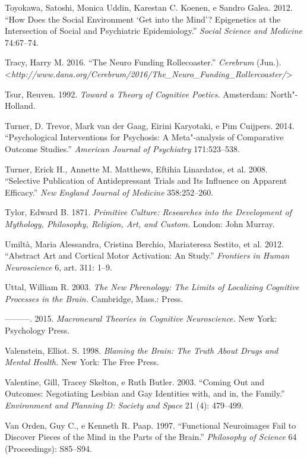 Toyokawa, Satoshi, Monica Uddin, Karestan C. Koenen, e Sandro Galea.
2012. ``How Does the Social Environment `Get into the Mind'? Epigenetics
at the Intersection of Social and Psychiatric Epidemiology.''
\emph{Social Science and Medicine} 74:67--74.

Tracy, Harry M. 2016. ``The Neuro Funding Rollecoaster.''
\emph{Cerebrum} (Jun.).
\textless{}\emph{http://www.dana.org/Cerebrum/2016/The\_Neuro\_Funding\_Rollercoaster/}\textgreater{}

Tsur, Reuven. 1992. \emph{Toward a Theory of Cognitive Poetics.}
Amsterdam: North"-Holland.

Turner, D. Trevor, Mark van der Gaag, Eirini Karyotaki, e Pim Cuijpers.
2014. ``Psychological Interventions for Psychosis: A Meta"-analysis of
Comparative Outcome Studies.'' \emph{American Journal of Psychiatry}
171:523--538.

Turner, Erick H., Annette M. Matthews, Eftihia Linardatos, et al. 2008.
``Selective Publication of Antidepressant Trials and Its Influence on
Apparent Efficacy.'' \emph{New England Journal of Medicine}
358:252--260.

Tylor, Edward B. 1871. \emph{Primitive Culture: Researches into the
Development of Mythology, Philosophy, Religion, Art, and Custom.}
London: John Murray.

Umiltà, Maria Alessandra, Cristina Berchio, Mariateresa Sestito, et al.
2012. ``Abstract Art and Cortical Motor Activation: An  Study.''
\emph{Frontiers in Human Neuroscience} 6, art. 311: 1--9.

Uttal, William R. 2003. \emph{The New Phrenology: The Limits of
Localizing Cognitive Processes in the Brain.} Cambridge, Mass.: 
Press.

---------. 2015. \emph{Macroneural Theories in Cognitive Neuroscience.}
New York: Psychology Press.

Valenstein, Elliot. S. 1998. \emph{Blaming the Brain: The Truth About
Drugs and Mental Health.} New York: The Free Press.

Valentine, Gill, Tracey Skelton, e Ruth Butler. 2003. ``Coming Out and
Outcomes: Negotiating Lesbian and Gay Identities with, and in, the
Family.'' \emph{Environment and Planning D: Society and Space} 21 (4):
479--499.

Van Orden, Guy C., e Kenneth R. Paap. 1997. ``Functional Neuroimages
Fail to Discover Pieces of the Mind in the Parts of the Brain.''
\emph{Philosophy of Science} 64 (Proceedings): S85--S94.

